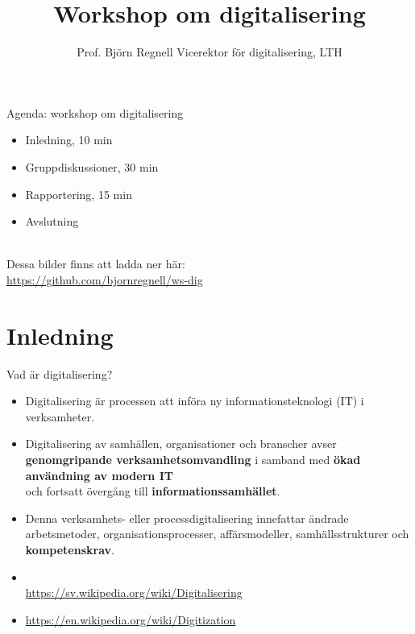 \documentclass[aspectratio=169]{beamer}
\title[B. Regnell, \today]{\selectfont Workshop om digitalisering}
\author[\href{https://github.com/bjornregnell/ws-dig}{github.com/bjornregnell/ws-dig}]{%
  Prof. Björn Regnell\newline
  Vicerektor för digitalisering, LTH}
\newcommand{\TitleSlide}{\begin{frame}[plain]\titlepage\end{frame}}
\newenvironment{Slide}[1]%
  {\begin{frame}[environment=Slide]{#1}}
  {\end{frame}}%
\begin{document}
\TitleSlide


\begin{Slide}{Agenda: workshop om digitalisering}
\begin{itemize}
    \item Inledning, 10 min 
    \item Gruppdiskussioner, 30 min 
    \item Rapportering, 15 min 
    \item Avslutning
\end{itemize}

~\\Dessa bilder finns att ladda ner här: \\ 
\url{https://github.com/bjornregnell/ws-dig}
\end{Slide}

\section{Inledning}
\begin{Slide}{Vad är digitalisering?}
  \begin{itemize}\small
      \item Digitalisering är processen att införa ny informationsteknologi (IT) i
      verksamheter. 
      \item Digitalisering av samhällen, organisationer och
      branscher avser \textbf{genomgripande verksamhetsomvandling} i samband
      med \textbf{ökad användning av modern IT} \\ och fortsatt övergång till
      \textbf{informationssamhället}. 
      
      \item Denna verksamhets- eller processdigitalisering innefattar ändrade arbetsmetoder,
      organisationsprocesser, affärsmodeller, samhällsstrukturer och
      \textbf{kompetenskrav}.
    \end{itemize}

    \begin{itemize}\small
      \item[]  ~\\\url{https://sv.wikipedia.org/wiki/Digitalisering}
      \item[]  \url{https://en.wikipedia.org/wiki/Digitization}
  \end{itemize}
\end{Slide}
\end{document}
